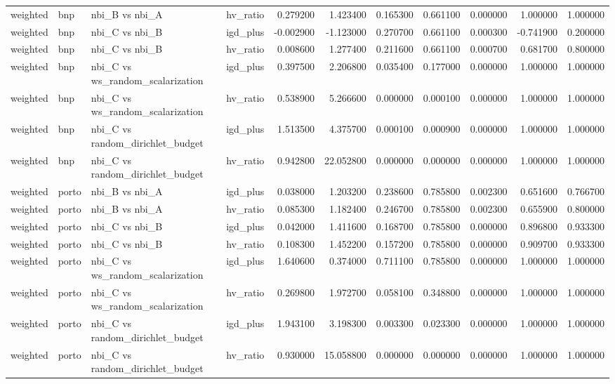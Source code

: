 \begin{landscape}
\begin{longtable}{llllrrrrrrr}
weighted & bnp & nbi\_B vs nbi\_A & hv\_ratio & 0.279200 & 1.423400 & 0.165300 & 0.661100 & 0.000000 & 1.000000 & 1.000000 \\
weighted & bnp & nbi\_C vs nbi\_B & igd\_plus & -0.002900 & -1.123000 & 0.270700 & 0.661100 & 0.000300 & -0.741900 & 0.200000 \\
weighted & bnp & nbi\_C vs nbi\_B & hv\_ratio & 0.008600 & 1.277400 & 0.211600 & 0.661100 & 0.000700 & 0.681700 & 0.800000 \\
weighted & bnp & nbi\_C vs ws\_random\_scalarization & igd\_plus & 0.397500 & 2.206800 & 0.035400 & 0.177000 & 0.000000 & 1.000000 & 1.000000 \\
weighted & bnp & nbi\_C vs ws\_random\_scalarization & hv\_ratio & 0.538900 & 5.266600 & 0.000000 & 0.000100 & 0.000000 & 1.000000 & 1.000000 \\
weighted & bnp & nbi\_C vs random\_dirichlet\_budget & igd\_plus & 1.513500 & 4.375700 & 0.000100 & 0.000900 & 0.000000 & 1.000000 & 1.000000 \\
weighted & bnp & nbi\_C vs random\_dirichlet\_budget & hv\_ratio & 0.942800 & 22.052800 & 0.000000 & 0.000000 & 0.000000 & 1.000000 & 1.000000 \\
weighted & porto & nbi\_B vs nbi\_A & igd\_plus & 0.038000 & 1.203200 & 0.238600 & 0.785800 & 0.002300 & 0.651600 & 0.766700 \\
weighted & porto & nbi\_B vs nbi\_A & hv\_ratio & 0.085300 & 1.182400 & 0.246700 & 0.785800 & 0.002300 & 0.655900 & 0.800000 \\
weighted & porto & nbi\_C vs nbi\_B & igd\_plus & 0.042000 & 1.411600 & 0.168700 & 0.785800 & 0.000000 & 0.896800 & 0.933300 \\
weighted & porto & nbi\_C vs nbi\_B & hv\_ratio & 0.108300 & 1.452200 & 0.157200 & 0.785800 & 0.000000 & 0.909700 & 0.933300 \\
weighted & porto & nbi\_C vs ws\_random\_scalarization & igd\_plus & 1.640600 & 0.374000 & 0.711100 & 0.785800 & 0.000000 & 1.000000 & 1.000000 \\
weighted & porto & nbi\_C vs ws\_random\_scalarization & hv\_ratio & 0.269800 & 1.972700 & 0.058100 & 0.348800 & 0.000000 & 1.000000 & 1.000000 \\
weighted & porto & nbi\_C vs random\_dirichlet\_budget & igd\_plus & 1.943100 & 3.198300 & 0.003300 & 0.023300 & 0.000000 & 1.000000 & 1.000000 \\
weighted & porto & nbi\_C vs random\_dirichlet\_budget & hv\_ratio & 0.930000 & 15.058800 & 0.000000 & 0.000000 & 0.000000 & 1.000000 & 1.000000 \\

\end{longtable}
\end{landscape}
